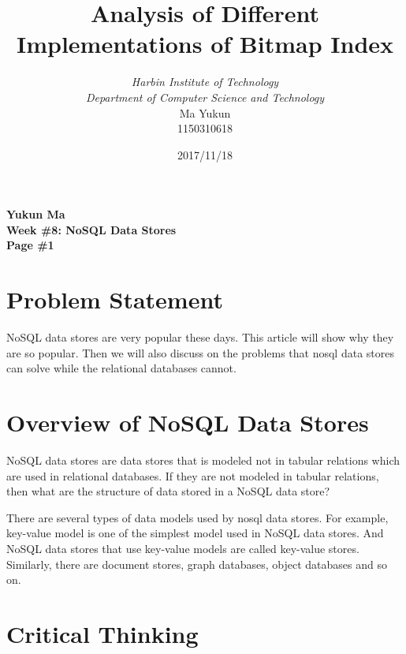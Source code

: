 \documentclass[12pt, a4paper]{article}
\begin{document}
\title{{\bf\Huge Analysis of Different Implementations of Bitmap Index}}
\author{\emph{Harbin Institute of Technology}\\\emph{Department of Computer Science and Technology}\\Ma Yukun\\1150310618}

\date{2017/11/18}

\nocite{*}


\begin{center}
{\textbf{
Yukun Ma\\
Week \#8: NoSQL Data Stores\\
Page \#1}}
\end{center}

\section{Problem Statement}

NoSQL data stores are very popular these days. This article will show why they are so popular. Then we will also discuss on the problems that nosql data stores can solve while the relational databases cannot.




\section{Overview of NoSQL Data Stores}

NoSQL data stores are data stores that is modeled not in tabular relations which are used in relational databases.\cite{wiki} If they are not modeled in tabular relations, then what are the structure of data stored in a NoSQL data store?

There are several types of data models used by nosql data stores. For example, key-value model is one of the simplest model used in NoSQL data stores.\cite{wiki} And NoSQL data stores that use key-value models are called key-value stores. Similarly, there are document stores, graph databases, object databases and so on.

\section{Critical Thinking}
\end{document}
